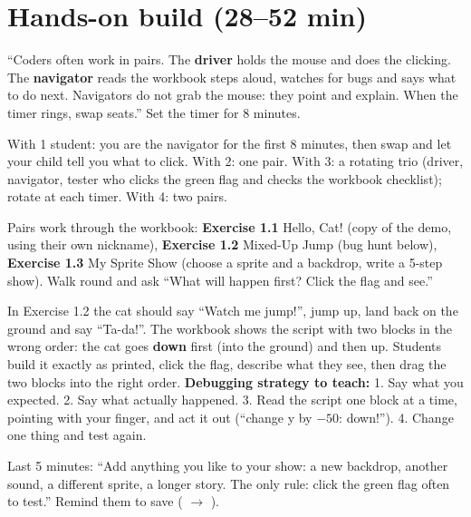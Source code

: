\section{Hands-on build (28--52 min)}
\begin{pairroles}
\enquote{Coders often work in pairs. The \textbf{driver} holds the mouse and does the clicking. The \textbf{navigator} reads the workbook steps aloud, watches for bugs and says what to do next. Navigators do not grab the mouse: they point and explain. When the timer rings, swap seats.} Set the timer for 8 minutes.

With 1 student: you are the navigator for the first 8 minutes, then swap and let your child tell you what to click. With 2: one pair. With 3: a rotating trio (driver, navigator, tester who clicks the green flag and checks the workbook checklist); rotate at each timer. With 4: two pairs.
\end{pairroles}

Pairs work through the workbook: \textbf{Exercise 1.1} Hello, Cat! (copy of the demo, using their own nickname), \textbf{Exercise 1.2} Mixed-Up Jump (bug hunt below), \textbf{Exercise 1.3} My Sprite Show (choose a sprite and a backdrop, write a 5-step show). Walk round and ask \enquote{What will happen first? Click the flag and see.}

\begin{bughunt}
In Exercise 1.2 the cat should say \enquote{Watch me jump!}, jump up, land back on the ground and say \enquote{Ta-da!}. The workbook shows the script with two blocks in the wrong order: the cat goes \textbf{down} first (into the ground) and then up. Students build it exactly as printed, click the flag, describe what they see, then drag the two blocks into the right order.
\textbf{Debugging strategy to teach:} 1. Say what you expected. 2. Say what actually happened. 3. Read the script one block at a time, pointing with your finger, and act it out (\enquote{change y by $-50$: down!}). 4. Change one thing and test again.
\end{bughunt}

\begin{freebuild}
Last 5 minutes: \enquote{Add anything you like to your show: a new backdrop, another sound, a different sprite, a longer story. The only rule: click the green flag often to test.} Remind them to save ( $\rightarrow$ ).
\end{freebuild}

